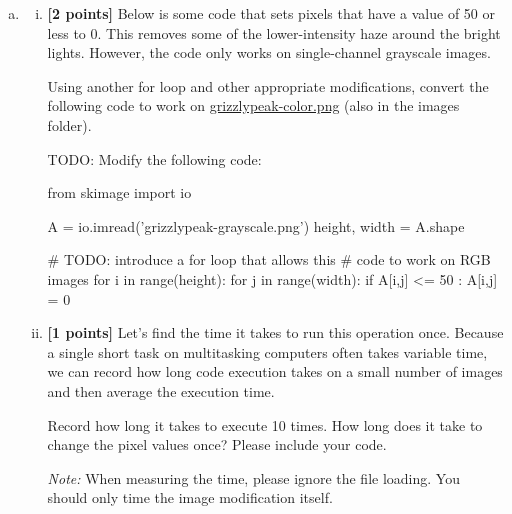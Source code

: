 \documentclass[11pt]{article}
\begin{document}
\begin{enumerate}[(a)]
    \item 
    \begin{enumerate}[(i)] \item
\textbf{[2 points]}
Below is some code that sets pixels that have a value of 50 or less to 0. This removes some of the lower-intensity haze around the bright lights. However, the code only works on single-channel grayscale images.

\begin{tcolorbox}[colback=orange!5!white,colframe=orange!75!black]
Using another for loop and other appropriate modifications, convert the following code to work on \href{run:images/grizzlypeak-color.png}{grizzlypeak-color.png} (also in the images folder).
\end{tcolorbox}

\begin{tcolorbox}[enhanced jigsaw,pad at break*=1mm,colback=white!5!white,colframe=green!75!black,height=10cm]
TODO: Modify the following code:
\begin{python}
from skimage import io

A = io.imread('grizzlypeak-grayscale.png')
height, width = A.shape

# TODO: introduce a for loop that allows this 
# code to work on RGB images
for i in range(height):
    for j in range(width):
        if A[i,j] <= 50 :
            A[i,j] = 0
\end{python}

\end{tcolorbox}

\item
\textbf{[1 points]} Let's find the time it takes to run this operation once. Because a single short task on multitasking computers often takes variable time, we can record how long code execution takes on a small number of images and then average the execution time.

\begin{tcolorbox}[colback=orange!5!white,colframe=orange!75!black]
Record how long it takes to execute 10 times. How long does it take to change the pixel values once? Please include your code.
\end{tcolorbox}

\emph{Note: } When measuring the time, please ignore the file loading. You should only time the image modification itself.


\end{enumerate}
\end{enumerate}
\end{document}
